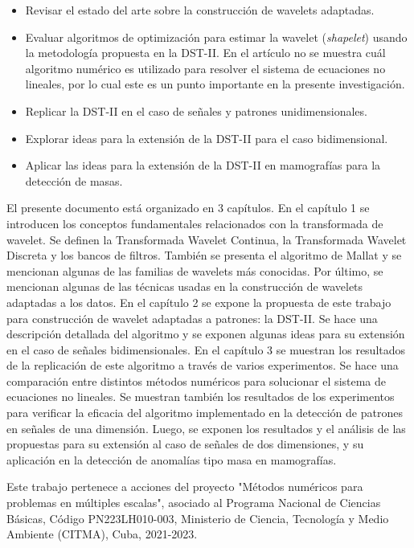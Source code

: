 \begin{itemize}
	\item Revisar el estado del arte sobre la construcción de wavelets adaptadas.
	\item Evaluar algoritmos de optimización para estimar la wavelet (\textit{shapelet})
		usando la metodología propuesta en la DST-II. En el artículo \cite{Guido2018} no se muestra
		cuál algoritmo numérico es utilizado para resolver el sistema de ecuaciones no lineales, 
		por lo cual este es un punto importante en la presente investigación.
	\item Replicar la DST-II en el caso de señales y patrones unidimensionales. 
	\item Explorar ideas para la extensión de la DST-II para el caso bidimensional. 
	\item Aplicar las ideas para la extensión de la DST-II en mamografías para la detección de masas.  
\end{itemize}

El presente documento está organizado en 3 capítulos.
En el capítulo 1 se introducen los conceptos fundamentales relacionados con la transformada de wavelet. Se definen
la Transformada Wavelet Continua, la Transformada Wavelet Discreta y los bancos de filtros.
También se presenta el algoritmo de Mallat y se mencionan algunas de las familias de wavelets más conocidas.
Por último, se mencionan algunas de las técnicas usadas en la construcción de wavelets adaptadas a los datos. 
En el capítulo 2 se expone la propuesta de este trabajo para construcción de wavelet adaptadas a patrones: 
la DST-II. Se hace una descripción detallada del algoritmo y se exponen algunas ideas para su extensión en el
caso de señales bidimensionales.
En el capítulo 3 se muestran los resultados de la replicación de este algoritmo a través de varios experimentos.
Se hace una comparación entre distintos métodos numéricos para solucionar el sistema de ecuaciones
no lineales. Se muestran también los resultados de los experimentos para verificar la eficacia del algoritmo implementado en  
la detección de patrones en señales de una dimensión. Luego, se exponen  los resultados y el análisis de las propuestas
para su extensión al caso de señales de dos dimensiones, y su aplicación en la detección de anomalías tipo masa en mamografías.

Este trabajo pertenece a acciones del proyecto "Métodos numéricos para problemas en múltiples escalas", asociado al Programa Nacional de Ciencias Básicas, Código PN223LH010-003, Ministerio de Ciencia, Tecnología y Medio Ambiente (CITMA), Cuba, 2021-2023.
